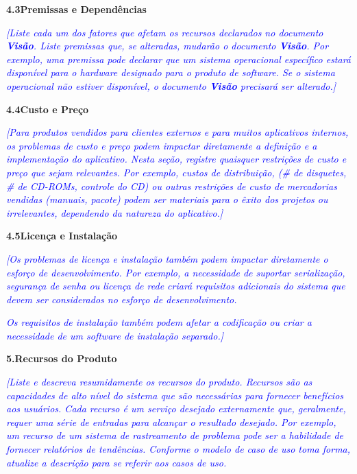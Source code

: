 \documentclass[a4paper]{article}
\begin{document}
\bigskip

\hypertarget{ryhuvdw0p8rj}{}\textbf{4.3Premissas e Depend\^encias}

\textit{\textcolor{blue}{[Liste cada um dos fatores que afetam os recursos declarados no documento
}}\textbf{\textit{\textcolor{blue}{Vis\~ao}}}\textit{\textcolor{blue}{. Liste premissas que, se alteradas, mudar\~ao o
documento }}\textbf{\textit{\textcolor{blue}{Vis\~ao}}}\textit{\textcolor{blue}{. Por exemplo, uma premissa pode
declarar que um sistema operacional espec\'ifico estar\'a dispon\'ivel para o hardware designado para o produto de
software. Se o sistema operacional n\~ao estiver dispon\'ivel, o documento
}}\textbf{\textit{\textcolor{blue}{Vis\~ao}}}\textit{\textcolor{blue}{ precisar\'a ser alterado.]}}

\hypertarget{iqoys7sdrgpk}{}\textbf{4.4Custo e Pre\c{c}o}

\textit{\textcolor{blue}{[Para produtos vendidos para clientes externos e para muitos aplicativos internos, os problemas
de custo e pre\c{c}o podem impactar diretamente a defini\c{c}\~ao e a implementa\c{c}\~ao do aplicativo. Nesta
se\c{c}\~ao, registre quaisquer restri\c{c}\~oes de custo e pre\c{c}o que sejam relevantes. Por exemplo, custos de
distribui\c{c}\~ao, (\# de disquetes, \# de CD-ROMs, controle do CD) ou outras restri\c{c}\~oes de custo de mercadorias
vendidas (manuais, pacote) podem ser materiais para o \^exito dos projetos ou irrelevantes, dependendo da natureza do
aplicativo.]}}

\hypertarget{7jqdvmp9503b}{}\textbf{4.5Licen\c{c}a e Instala\c{c}\~ao}

\textit{\textcolor{blue}{[Os problemas de licen\c{c}a e instala\c{c}\~ao tamb\'em podem impactar diretamente o
esfor\c{c}o de desenvolvimento. Por exemplo, a necessidade de suportar serializa\c{c}\~ao, seguran\c{c}a de senha ou
licen\c{c}a de rede criar\'a requisitos adicionais do sistema que devem ser considerados no esfor\c{c}o de
desenvolvimento.}}

\textit{\textcolor{blue}{Os requisitos de instala\c{c}\~ao tamb\'em podem afetar a codifica\c{c}\~ao ou criar a
necessidade de um software de instala\c{c}\~ao separado.]}}

\hypertarget{iggypmnp2sfk}{}\textbf{5.Recursos do Produto}

\textit{\textcolor{blue}{[Liste e descreva resumidamente os recursos do produto. Recursos s\~ao as capacidades de alto
n\'ivel do sistema que s\~ao necess\'arias para fornecer benef\'icios aos usu\'arios. Cada recurso \'e um servi\c{c}o
desejado externamente que, geralmente, requer uma s\'erie de entradas para alcan\c{c}ar o resultado desejado. Por
exemplo, um recurso de um sistema de rastreamento de problema pode ser a habilidade de fornecer relat\'orios de
tend\^encias. Conforme o modelo de caso de uso toma forma, atualize a descri\c{c}\~ao para se referir aos casos de
uso.}}
\end{document}
